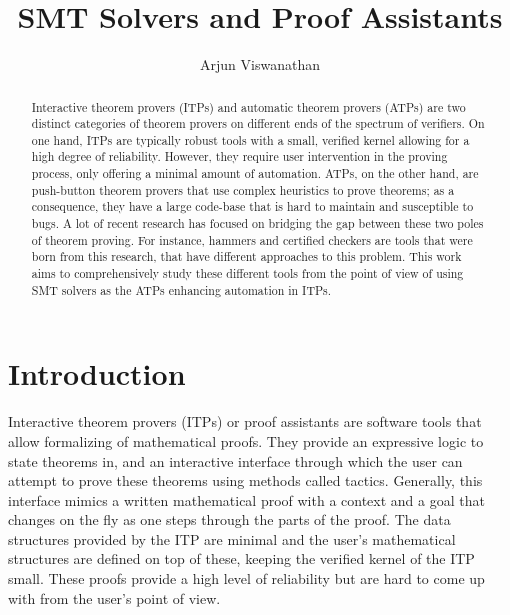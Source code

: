 \documentclass{article}
\begin{document}
\title{SMT Solvers and Proof Assistants}
\author{Arjun Viswanathan}
\date{}
\maketitle
\begin{abstract}
	Interactive theorem provers (ITPs) and automatic theorem provers (ATPs)
	are two distinct categories of theorem provers on different ends 
	of the spectrum of verifiers. On one hand, 
	ITPs are typically robust tools with a small, verified kernel 
	allowing for a high degree of reliability. However, they 
	require user intervention in the proving process, only
	offering a minimal amount of automation. ATPs, on the other hand, 
	are push-button theorem provers that use complex heuristics to prove 
	theorems; as a consequence, they have a large code-base that is hard 
	to maintain and susceptible to bugs. A lot of recent research 
	has focused on bridging the gap between these two poles 
	of theorem proving. For instance, hammers and certified checkers 
	are tools that were born from this research, that have different 
	approaches to this problem. This work aims to 
	comprehensively study these different tools 
	from the point of view of using SMT solvers as
	the ATPs enhancing automation in ITPs.
\end{abstract}

\section{Introduction}
\label{sec:intro}
	Interactive theorem provers (ITPs) or proof assistants are 
	software tools that allow formalizing of mathematical proofs.
	They provide an expressive logic to state theorems in, and 
	an interactive interface through which the user can 
	attempt to prove these theorems using methods 
	called tactics. Generally, this interface mimics a 
	written mathematical proof with a context and a goal 
	that changes on the fly as one steps through the parts 
	of the proof. The data structures provided by the ITP are 
	minimal and the user's mathematical structures are 
	defined on top of these, keeping the verified kernel of the 
	ITP small. These proofs provide a high level of reliability
	but are hard to come up with from the user's point of view. 
	
\end{document}
